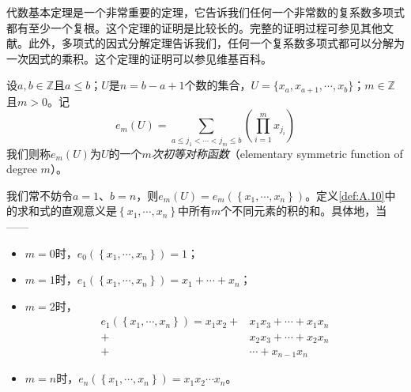 \documentclass[../main.tex]{subfiles}
\begin{document}
代数基本定理是一个非常重要的定理，它告诉我们任何一个非常数的复系数多项式都有至少一个复根。这个定理的证明是比较长的。完整的证明过程可参见其他文献\cite{Schreier1961}。此外，多项式的因式分解定理告诉我们，任何一个复系数多项式都可以分解为一次因式的乘积。这个定理的证明可以参见维基百科。

\begin{definition}[初等对称函数]\label{def:A.10}
    设$a,b\in\mathbb{Z}$且$a\leq b$；$U$是$n=b-a+1$个数的集合，$U=\{x_a,x_{a+1},\cdots,x_b\}$；$m\in\mathbb{Z}$且$m>0$。记
    \[e_m\left(U\right)=\sum_{a\leq j_1<\cdots<j_m\leq b}\left(\prod_{i=1}^m x_{j_i}\right)\]
    我们则称$e_m\left(U\right)$为$U$的一个\emph{$m$次初等对称函数}（elementary symmetric function of degree $m$）。
\end{definition}

我们常不妨令$a=1$、$b=n$，则$e_m\left(U\right)=e_m\left(\left\{x_1,\cdots,x_n\right\}\right)$。定义\ref{def:A.10}中的求和式的直观意义是$\left\{x_1,\cdots,x_n\right\}$中所有$m$个不同元素的积的和。具体地，当——
\begin{itemize}
    \item $m=0$时，$e_0\left(\left\{x_1,\cdots,x_n\right\}\right)=1$；
    \item $m=1$时，$e_1\left(\left\{x_1,\cdots,x_n\right\}\right)=x_1+\cdots+x_n$；
    \item $m=2$时，
          \[\begin{aligned}
                  e_1\left(\left\{x_1,\cdots,x_n\right\}\right)=x_1x_2+ & x_1x_3+\cdots+x_1x_n \\
                  +                                                     & x_2x_3+\cdots+x_2x_n \\
                  +                                                     & \cdots+x_{n-1}x_n
              \end{aligned}\]
    \item $m=n$时，$e_n\left(\left\{x_1,\cdots,x_n\right\}\right)=x_1x_2\cdots x_n$。
\end{itemize}
\end{document}
